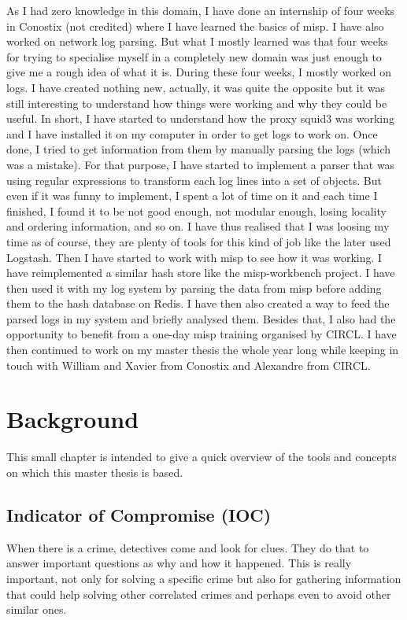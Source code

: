 \documentclass{eplmastersthesis}
\begin{document}
As I had zero knowledge in this domain, I have done an internship of four weeks in Conostix (not credited) where I have learned the basics of \gls{misp}. I have also worked on network log parsing. But what I mostly learned was that four weeks for trying to specialise myself in a completely new domain was just enough to give me a rough idea of what it is.
During these four weeks, I mostly worked on logs. I have created nothing new, actually, it was quite the opposite but it was still interesting to understand how things were working and why they could be useful. 
In short, I have started to understand how the proxy squid3 was working and I have installed it on my computer in order to get logs to work on. Once done, I tried to get information from them by manually parsing the logs (which was a mistake). For that purpose, I have started to implement a parser that was using regular expressions to transform each log lines into a set of objects. But even if it was funny to implement, I spent a lot of time on it and each time I finished, I found it to be not good enough, not modular enough, losing locality and ordering information, and so on. I have thus realised that I was loosing my time as of course, they are plenty of tools for this kind of job like the later used Logstash. Then I have started to work with \gls{misp} to see how it was working. I have reimplemented a similar hash store like the misp-workbench project. I have then used it with my log system by parsing the data from \gls{misp} before adding them to the hash database on Redis. I have then also created a way to feed the parsed logs in my system and briefly analysed them.
Besides that, I also had the opportunity to benefit from a one-day \gls{misp} training organised by CIRCL.
I have then continued to work on my master thesis the whole year long while keeping in touch with William and Xavier from Conostix and Alexandre from CIRCL.

\chapter{Background}
This small chapter is intended to give a quick overview of the tools and concepts on which this master thesis is based.

\section{Indicator of Compromise (IOC)}
When there is a crime, detectives come and look for clues. They do that to answer important questions as why and how it happened. This is really important, not only for solving a specific crime but also for gathering information that could help solving other correlated crimes and perhaps even to avoid other similar ones.\\
\end{document}
